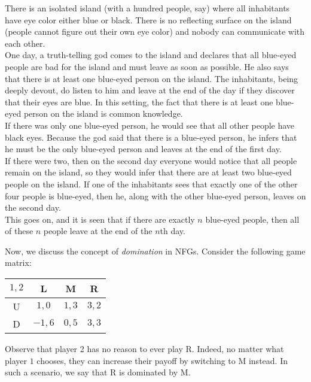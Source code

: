 	\begin{fex}
		There is an isolated island (with a hundred people, say) where all inhabitants have eye color either blue or black. There is no reflecting surface on the island (people cannot figure out their own eye color) and nobody can communicate with each other.\\
		One day, a truth-telling god comes to the island and declares that all blue-eyed people are bad for the island and must leave as soon as possible. He also says that there is at least one blue-eyed person on the island. The inhabitants, being deeply devout, do listen to him and leave at the end of the day if they discover that their eyes are blue. In this setting, the fact that there is at least one blue-eyed person on the island is common knowledge. \\

		If there was only one blue-eyed person, he would see that all other people have black eyes. Because the god said that there is a blue-eyed person, he infers that he must be the only blue-eyed person and leaves at the end of the first day.\\
		If there were two, then on the second day everyone would notice that all people remain on the island, so they would infer that there are at least two blue-eyed people on the island. If one of the inhabitants sees that exactly one of the other four people is blue-eyed, then he, along with the other blue-eyed person, leaves on the second day.\\
		This goes on, and it is seen that if there are exactly $n$ blue-eyed people, then all of these $n$ people leave at the end of the $n$th day.\\
	\end{fex}

	Now, we discuss the concept of \emph{domination} in NFGs. Consider the following game matrix:

	\begin{center}
	\begin{tabular}{|c||c|c|c|}
		\hline
		$1, 2$ & \textsf{L} & \textsf{M} & \textsf{R} \\
		\hline \hline
		\textsf{U} & $1, 0$ & $1,3$ & $3,2$ \\
		\hline
		\textsf{D} & $-1,6$ & $0,5$ & $3,3$ \\
		\hline
	\end{tabular}
	\end{center}

	Observe that player \textsf{2} has no reason to ever play \textsf{R}. Indeed, no matter what player $1$ chooses, they can increase their payoff by switching to \textsf{M} instead. In such a scenario, we say that \textsf{R} is dominated by \textsf{M}.\\

